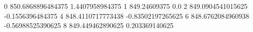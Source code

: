 0 850.6868896484375 1.4407958984375
1 849.24609375 0.0
2 849.0904541015625 -0.1556396484375
4 848.4110717773438 -0.83502197265625
6 848.6762084960938 -0.56988525390625
8 849.449462890625 0.203369140625

